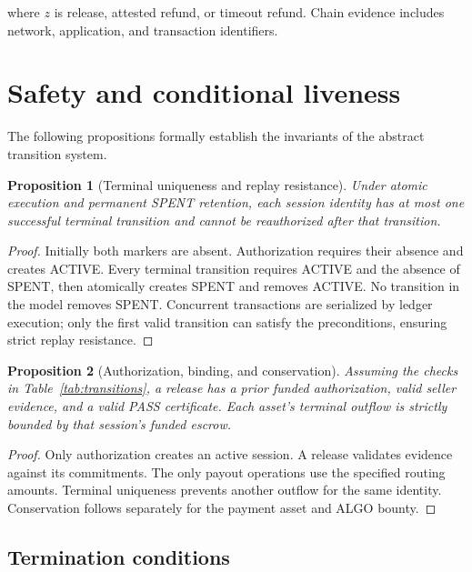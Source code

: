 \documentclass[fleqn,10pt,lineno]{wlpeerj}
\newtheorem{proposition}{Proposition}
\begin{document}
where $z$ is release, attested refund, or timeout refund. Chain evidence includes network, application, and transaction identifiers.

\section{Safety and conditional liveness}
\label{sec:safety}

The following propositions formally establish the invariants of the abstract transition system.

\begin{proposition}[Terminal uniqueness and replay resistance]
Under atomic execution and permanent SPENT retention, each session identity has at most one successful terminal transition and cannot be reauthorized after that transition.
\end{proposition}

\begin{proof}
Initially both markers are absent. Authorization requires their absence and creates ACTIVE. Every terminal transition requires ACTIVE and the absence of SPENT, then atomically creates SPENT and removes ACTIVE. No transition in the model removes SPENT. Concurrent transactions are serialized by ledger execution; only the first valid transition can satisfy the preconditions, ensuring strict replay resistance.
\end{proof}

\begin{proposition}[Authorization, binding, and conservation]
Assuming the checks in Table~\ref{tab:transitions}, a release has a prior funded authorization, valid seller evidence, and a valid PASS certificate. Each asset's terminal outflow is strictly bounded by that session's funded escrow.
\end{proposition}

\begin{proof}
Only authorization creates an active session. A release validates evidence against its commitments. The only payout operations use the specified routing amounts. Terminal uniqueness prevents another outflow for the same identity. Conservation follows separately for the payment asset and ALGO bounty.
\end{proof}

\subsection{Termination conditions}
\end{document}
